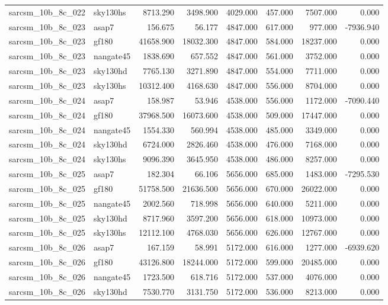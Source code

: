\begin{tabular}{llrrrrrr}
sarcsm\_10b\_8c\_022 & sky130hs & 8713.290 & 3498.900 & 4029.000 & 457.000 & 7507.000 & 0.000 \\
sarcsm\_10b\_8c\_023 & asap7 & 156.675 & 56.177 & 4847.000 & 617.000 & 977.000 & -7936.940 \\
sarcsm\_10b\_8c\_023 & gf180 & 41658.900 & 18032.300 & 4847.000 & 584.000 & 18237.000 & 0.000 \\
sarcsm\_10b\_8c\_023 & nangate45 & 1838.690 & 657.552 & 4847.000 & 561.000 & 3752.000 & 0.000 \\
sarcsm\_10b\_8c\_023 & sky130hd & 7765.130 & 3271.890 & 4847.000 & 554.000 & 7711.000 & 0.000 \\
sarcsm\_10b\_8c\_023 & sky130hs & 10312.400 & 4168.630 & 4847.000 & 556.000 & 8704.000 & 0.000 \\
sarcsm\_10b\_8c\_024 & asap7 & 158.987 & 53.946 & 4538.000 & 556.000 & 1172.000 & -7090.440 \\
sarcsm\_10b\_8c\_024 & gf180 & 37968.500 & 16073.600 & 4538.000 & 509.000 & 17447.000 & 0.000 \\
sarcsm\_10b\_8c\_024 & nangate45 & 1554.330 & 560.994 & 4538.000 & 485.000 & 3349.000 & 0.000 \\
sarcsm\_10b\_8c\_024 & sky130hd & 6724.000 & 2826.460 & 4538.000 & 476.000 & 7168.000 & 0.000 \\
sarcsm\_10b\_8c\_024 & sky130hs & 9096.390 & 3645.950 & 4538.000 & 486.000 & 8257.000 & 0.000 \\
sarcsm\_10b\_8c\_025 & asap7 & 182.304 & 66.106 & 5656.000 & 685.000 & 1483.000 & -7295.530 \\
sarcsm\_10b\_8c\_025 & gf180 & 51758.500 & 21636.500 & 5656.000 & 670.000 & 26022.000 & 0.000 \\
sarcsm\_10b\_8c\_025 & nangate45 & 2002.560 & 718.998 & 5656.000 & 640.000 & 5211.000 & 0.000 \\
sarcsm\_10b\_8c\_025 & sky130hd & 8717.960 & 3597.200 & 5656.000 & 618.000 & 10973.000 & 0.000 \\
sarcsm\_10b\_8c\_025 & sky130hs & 12112.100 & 4768.030 & 5656.000 & 626.000 & 12767.000 & 0.000 \\
sarcsm\_10b\_8c\_026 & asap7 & 167.159 & 58.991 & 5172.000 & 616.000 & 1277.000 & -6939.620 \\
sarcsm\_10b\_8c\_026 & gf180 & 43126.800 & 18244.000 & 5172.000 & 599.000 & 20485.000 & 0.000 \\
sarcsm\_10b\_8c\_026 & nangate45 & 1723.500 & 618.716 & 5172.000 & 537.000 & 4076.000 & 0.000 \\
sarcsm\_10b\_8c\_026 & sky130hd & 7530.770 & 3131.750 & 5172.000 & 536.000 & 8213.000 & 0.000 \\

\end{tabular}
